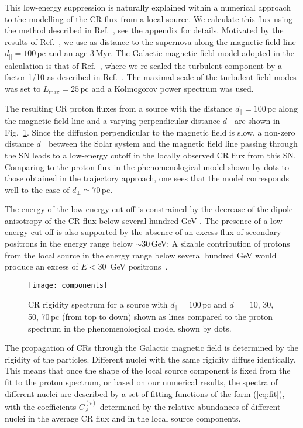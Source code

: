 \documentclass[prd,aps,twocolumn]{revtex4}
\begin{document}
This low-energy suppression is naturally explained within a numerical 
approach to the modelling of the CR flux from a local source. We 
calculate this flux using the  method described in Ref.~\cite{PRL}, 
see the appendix for details. Motivated
 by the results of Ref.~\cite{Sc17}, we use as distance to 
the supernova  along the magnetic field line $d_{||}=100$\,pc and an age 3\,Myr.
The Galactic magnetic field model 
adopted in the calculation is that of Ref.~\cite{JF}, where we re-scaled
the turbulent component by a factor 1/10 as described in Ref.~\cite{GKS14,GKS15}.
The maximal scale of the turbulent field modes was set to $L_{\max}= 25$\,pc 
and a Kolmogorov power spectrum was used.

The resulting CR proton fluxes from a source with the distance
$d_\|=100$\,pc 
along the magnetic field line and a varying perpendicular distance $d_\perp$
are shown in Fig.~\ref{perp}. Since the diffusion perpendicular 
to the magnetic field is slow, a non-zero distance $d_\perp$ between the 
Solar system and the magnetic field line passing through the SN leads to a
low-energy cutoff in the locally observed CR flux from this SN.
 Comparing to the proton flux in the phenomenological model shown 
by dots to those obtained in the trajectory approach, one sees that
the model corresponds well to the case of  $d_\perp\simeq 70$\,pc. 

The energy of the low-energy cut-off is constrained by the decrease of the 
dipole anisotropy of the CR flux below several hundred GeV \cite{savchenko}.
The presence of a low-energy cut-off is also supported by the absence of an
excess flux of secondary positrons in the energy range below $\sim 30$\,GeV:
A sizable contribution  of protons from the local source in the energy 
range below several hundred GeV would produce an excess of $E<30$~GeV 
positrons~\cite{PRL}. 




\begin{figure}
\texttt{[image: components]}
\caption{CR rigidity spectrum for a source with $d_\|=100$\,pc and
 $d_\perp=10$, 30, 50, 70\,pc (from top to down) shown as lines compared to
the proton spectrum in the phenomenological model shown by dots.
\label{perp}}
\end{figure}



The propagation of CRs through the Galactic magnetic field is determined by 
the rigidity of the particles. Different nuclei with the same rigidity
diffuse identically. This means that once the shape of the local source 
component is fixed from the fit to the proton spectrum, or based on our
numerical results, the spectra of different nuclei are described by a set 
of fitting functions of the form (\ref{eq:fit}), with the coefficients 
$C^{(i)}_A$ determined by the relative abundances of different 
nuclei in the average CR flux and in the local source components. 
\end{document}
